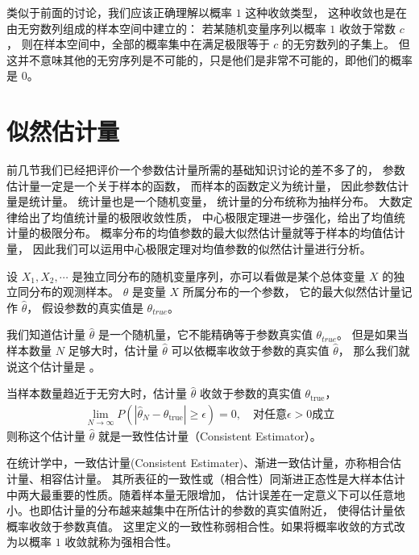 \documentclass[letterpaper,10pt,english]{sphinxmanual}
\begin{document}
类似于前面的讨论，我们应该正确理解以概率 \(1\) 这种收敛类型，
这种收敛也是在由无穷数列组成的样本空间中建立的：
若某随机变量序列以概率 \(1\) 收敛于常数 \(c\)，
则在样本空间中，全部的概率集中在满足极限等于 \(c\) 的无穷数列的子集上。
但这并不意味其他的无穷序列是不可能的，只是他们是非常不可能的，即他们的概率是 \(0\)。


\section{似然估计量}
\label{\detokenize{_u63a8_u65ad_u4e0e_u68c0_u9a8c/content:id12}}
前几节我们已经把评价一个参数估计量所需的基础知识讨论的差不多了的，
参数估计量一定是一个关于样本的函数，
而样本的函数定义为统计量，
因此参数估计量是统计量。
统计量也是一个随机变量，
统计量的分布统称为抽样分布。
大数定律给出了均值统计量的极限收敛性质，
中心极限定理进一步强化，给出了均值统计量的极限分布。
概率分布的均值参数的最大似然估计量就等于样本的均值估计量，
因此我们可以运用中心极限定理对均值参数的似然估计量进行分析。

设 \(X_1,X_2,\cdots\) 是独立同分布的随机变量序列，亦可以看做是某个总体变量 \(X\)
的独立同分布的观测样本。
\(\theta\) 是变量 \(X\) 所属分布的一个参数，
它的最大似然估计量记作 \(\hat{\theta}\)，
假设参数的真实值是 \(\theta_{true}\)。

我们知道估计量 \(\hat{\theta}\) 是一个随机量，它不能精确等于参数真实值 \(\theta_{true}\)。
但是如果当样本数量 \(N\) 足够大时，估计量 \(\hat{\theta}\) 可以依概率收敛于参数的真实值 \(\hat{\theta}\)，
那么我们就说这个估计量是  。

\begin{sphinxShadowBox}

当样本数量趋近于无穷大时，估计量 \(\hat{\theta}\)  收敛于参数的真实值 \(\theta_{\text{true}}\)，
\begin{equation}\label{equation:推断与检验/content:推断与检验/content:47}
\begin{split}\lim_{ N \rightarrow \infty} P( | \hat{\theta}_N- \theta_{\text{true}}| \geq \epsilon ) = 0,
\quad \text{对任意} \epsilon >0 \text{成立}\end{split}
\end{equation}
则称这个估计量 \(\hat{\theta}\) 就是一致性估计量（Consistent Estimator）。
\end{sphinxShadowBox}

在统计学中，一致估计量(Consistent Estimater)、渐进一致估计量，亦称相合估计量、相容估计量。
其所表征的一致性或（相合性）同渐进正态性是大样本估计中两大最重要的性质。随着样本量无限增加，
估计误差在一定意义下可以任意地小。也即估计量的分布越来越集中在所估计的参数的真实值附近，
使得估计量依概率收敛于参数真值。
这里定义的一致性称弱相合性。如果将概率收敛的方式改为以概率 \(1\) 收敛就称为强相合性。
\end{document}
